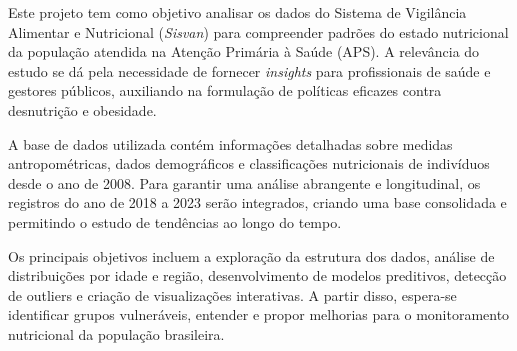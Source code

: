 \documentclass[
	article,			%
	11pt,				%
	oneside,			%
	a4paper,			%
	english,			%
	brazil,				%
	sumario=tradicional
	]{abntex2}
\begin{document}

\frenchspacing 


%
%

\maketitle



\begin{resumoumacoluna}
\textit{}
Este projeto tem como objetivo analisar os dados do Sistema de Vigilância Alimentar e Nutricional (\textit{Sisvan}) para compreender padrões do estado nutricional da população atendida na Atenção Primária à Saúde (APS). A relevância do estudo se dá pela necessidade de fornecer \textit{insights} para profissionais de saúde e gestores públicos, auxiliando na formulação de políticas eficazes contra desnutrição e obesidade.

A base de dados utilizada contém informações detalhadas sobre medidas antropométricas, dados demográficos e classificações nutricionais de indivíduos desde o ano de 2008. Para garantir uma análise abrangente e longitudinal, os registros do ano de 2018 a 2023 serão integrados, criando uma base consolidada e permitindo o estudo de tendências ao longo do tempo.

Os principais objetivos incluem a exploração da estrutura dos dados, análise de distribuições por idade e região, desenvolvimento de modelos preditivos, detecção de outliers e criação de visualizações interativas. A partir disso, espera-se identificar grupos vulneráveis, entender e propor melhorias para o monitoramento nutricional da população brasileira.
 
 \noindent
\end{resumoumacoluna}

\end{document}
